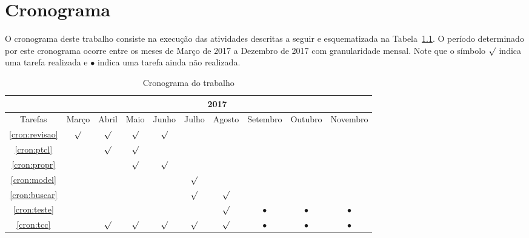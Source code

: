 \chapter{Cronograma}\label{capitulo:cronograma}

O cronograma deste trabalho consiste na execução das atividades descritas a seguir e esquematizada na Tabela~\ref{tab:cronograma}. 
O período determinado por este cronograma ocorre entre os meses de Março de 2017 a Dezembro de 2017 com granularidade mensal.
Note que o símbolo $\surd$ indica uma tarefa realizada e $\bullet$ indica uma tarefa ainda não realizada. 

\begin{table}[!ht] %
	\centering\tiny{
		\caption{Cronograma do trabalho \label{tab:cronograma}}		
		\begin{tabular}{|c|c|c|c|c|c|c|c|c|c|}
			\hline & \multicolumn{9}{c|}{2017}\\
			\hline Tarefas                   & Março & Abril & Maio & Junho & Julho & Agosto & Setembro & Outubro & Novembro \\
			\hline \eqref{cron:revisao}  &$\surd$&$\surd$&$\surd$&$\surd$&&&&&\\
			\hline \eqref{cron:ptcl} &&$\surd$&$\surd$&&&&&&\\
			\hline \eqref{cron:propr} &&&$\surd$&$\surd$&&&&&\\
			\hline \eqref{cron:model}  &&&&&$\surd$&&&&\\
			\hline \eqref{cron:buscar} &&&&&$\surd$&$\surd$&&&\\
			\hline \eqref{cron:teste} &&&&&&$\surd$&$\bullet$&$\bullet$&$\bullet$\\
			\hline \eqref{cron:tcc} &&$\surd$&$\surd$&$\surd$&$\surd$&$\surd$&$\bullet$&$\bullet$&$\bullet$\\
			\hline
		\end{tabular}
	}
\end{table}

